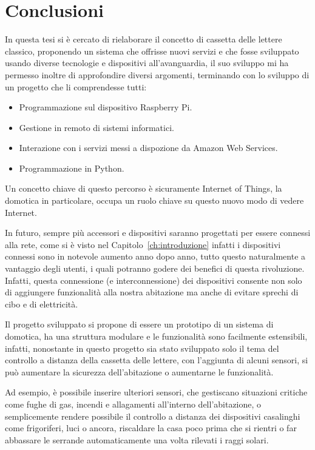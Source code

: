 \chapter{Conclusioni}
\label{ch:conclusions}
In questa tesi si è cercato di rielaborare il concetto di cassetta delle lettere classico, proponendo un sistema che offrisse nuovi servizi e che fosse sviluppato 
usando diverse tecnologie e dispositivi all'avanguardia, il suo sviluppo mi ha permesso inoltre di approfondire diversi argomenti, terminando con lo sviluppo di un 
progetto che li comprendesse tutti: 
\begin{itemize}
    \item Programmazione sul dispositivo Raspberry Pi.
    \item Gestione in remoto di sistemi informatici.
    \item Interazione con i servizi messi a dispozione da Amazon Web Services.
    \item Programmazione in Python.
\end{itemize}
Un concetto chiave di questo percorso è sicuramente Internet of Things, la domotica in particolare, occupa un ruolo chiave su questo nuovo modo di vedere Internet. 

In futuro, sempre più accessori e dispositivi saranno progettati per essere connessi alla rete, come si è visto nel Capitolo~\ref{ch:introduzione} infatti i dispositivi 
connessi sono in notevole aumento anno dopo anno, tutto questo naturalmente a vantaggio degli utenti, i quali potranno godere dei benefici di questa rivoluzione. Infatti, 
questa connessione (e interconnessione) dei dispositivi consente non solo di aggiungere funzionalità alla nostra abitazione ma anche di evitare sprechi di cibo e di 
elettricità.

Il progetto sviluppato si propone di essere un prototipo di un sistema di domotica, ha una struttura modulare e le funzionalità sono facilmente estensibili, infatti, 
nonostante in questo progetto sia stato sviluppato solo il tema del controllo a distanza della cassetta delle lettere, con l'aggiunta di alcuni sensori, si può 
aumentare la sicurezza dell'abitazione o aumentarne le funzionalità. 

Ad esempio, è possibile inserire ulteriori sensori, che gestiscano situazioni critiche come fughe di gas, incendi e allagamenti
all'interno dell'abitazione, o semplicemente rendere possibile il controllo a distanza dei dispositivi casalinghi come frigoriferi, luci o ancora, riscaldare la casa 
poco prima che si rientri o far abbassare le serrande automaticamente una volta rilevati i raggi solari.
\hbox{}
\thispagestyle{empty}
\newpage 